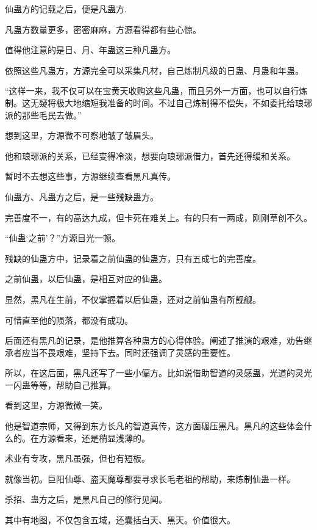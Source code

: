 
\begin{this_body}

仙蛊方的记载之后，便是凡蛊方.

凡蛊方数量更多，密密麻麻，方源看得都有些心惊。

值得他注意的是日、月、年蛊这三种凡蛊方。

依照这些凡蛊方，方源完全可以采集凡材，自己炼制凡级的日蛊、月蛊和年蛊。

“这样一来，我不仅可以在宝黄天收购这些凡蛊，而且另外一方面，也可以自行炼制。这无疑将极大地缩短我准备的时间。不过自己炼制得不偿失，不如委托给琅琊派的那些毛民去做。”

想到这里，方源微不可察地皱了皱眉头。

他和琅琊派的关系，已经变得冷淡，想要向琅琊派借力，首先还得缓和关系。

暂时不去想这些事，方源继续查看黑凡真传。

仙蛊方、凡蛊方之后，是一些残缺蛊方。

完善度不一，有的高达九成，但卡死在难关上。有的只有一两成，刚刚草创不久。

“仙蛊‘之前’？”方源目光一顿。

残缺的仙蛊方中，记录着之前仙蛊的仙蛊方，只有五成七的完善度。

之前仙蛊，以后仙蛊，是相互对应的仙蛊。

显然，黑凡在生前，不仅掌握着以后仙蛊，还对之前仙蛊有所觊觎。

可惜直至他的陨落，都没有成功。

后面还有黑凡的记录，是他推算各种蛊方的心得体验。阐述了推演的艰难，劝告继承者应当不畏艰难，坚持下去。同时还强调了灵感的重要性。

所以，在这后面，黑凡还写了一些小偏方。比如说借助智道的灵感蛊，光道的灵光一闪蛊等等，帮助自己推算。

看到这里，方源微微一笑。

他是智道宗师，又得到东方长凡的智道真传，这方面碾压黑凡。黑凡的这些体会什么的。在方源看来，还是稍显浅薄的。

术业有专攻，黑凡虽强，但也有短板。

就像当初。巨阳仙尊、盗天魔尊都要寻求长毛老祖的帮助，来炼制仙蛊一样。

杀招、蛊方之后，是黑凡自己的修行见闻。

其中有地图，不仅包含五域，还囊括白天、黑天。价值很大。


\end{this_body}
